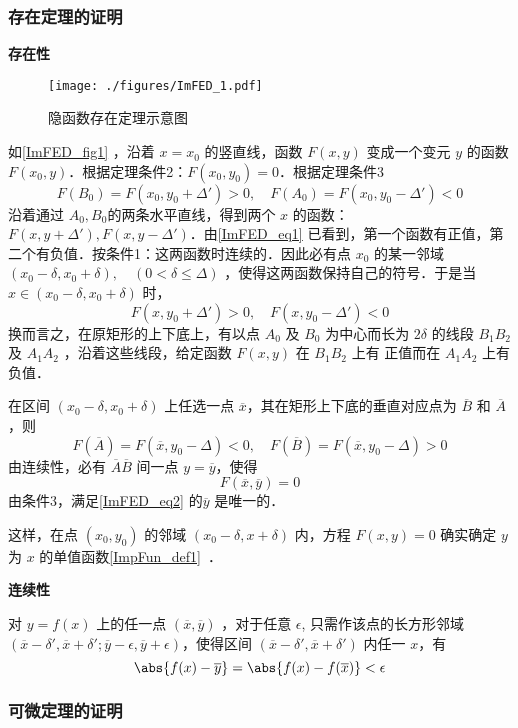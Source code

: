\subsubsection{存在定理的证明}
\textbf{存在性}
\begin{figure}[ht]
\centering
\texttt{[image: ./figures/ImFED\_1.pdf]}
\caption{隐函数存在定理示意图} \label{ImFED_fig1}
\end{figure}
如\autoref{ImFED_fig1} ，沿着 $x=x_0$ 的竖直线，函数 $F(x,y)$ 变成一个变元 $y$ 的函数 $F(x_0,y)$．根据定理条件2：$F(x_0,y_0)=0$．根据定理条件3
\begin{equation}\label{ImFED_eq1}
F(B_0)=F(x_0,y_0+\Delta')>0,\quad F(A_0)=F(x_0,y_0-\Delta')<0
\end{equation}
沿着通过 $A_0,B_0$的两条水平直线，得到两个 $x$ 的函数：$F(x,y+\Delta'),F(x,y-\Delta')$．由\autoref{ImFED_eq1} 已看到，第一个函数有正值，第二个有负值．按条件1：这两函数时连续的．因此必有点 $x_0$ 的某一邻域 $(x_0-\delta,x_0+\delta),\quad(0<\delta\leq\Delta)$ ，使得这两函数保持自己的符号．于是当 $x\in(x_0-\delta,x_0+\delta)$ 时，
\begin{equation}
F(x,y_0+\Delta')>0,\quad F(x,y_0-\Delta')<0
\end{equation}
换而言之，在原矩形的上下底上，有以点 $A_0$ 及 $B_0$ 为中心而长为 $2\delta$ 的线段  $B_1B_2$ 及 $A_1A_2$ ，沿着这些线段，给定函数 $F(x,y)$ 在 $B_1B_2$ 上有 正值而在 $A_1A_2$ 上有负值．

在区间 $(x_0-\delta,x_0+\delta)$ 上任选一点 $\overline{x}$，其在矩形上下底的垂直对应点为 $\overline{B}$ 和 $\overline{A}$，则
\begin{equation}
F(\overline{A})=F(\overline{x},y_0-\Delta)<0,\quad F(\overline{B})=F(\overline{x},y_0-\Delta)>0
\end{equation}
由连续性，必有 $\overline{A}\overline{B}$ 间一点 $y=\overline{y}$，使得
\begin{equation}\label{ImFED_eq2}
F(\overline{x},\overline{y})=0
\end{equation}
由条件3，满足\autoref{ImFED_eq2} 的$\overline{y}$ 是唯一的．

这样，在点 $(x_0,y_0)$ 的邻域 $(x_0-\delta,x+\delta)$ 内，方程 $F(x,y)=0$ 确实确定 $y$ 为 $x$ 的单值函数\autoref{ImpFun_def1}~．

\textbf{连续性}

对 $y=f(x)$ 上的任一点 $(\overline{x},\overline{y})$ ，对于任意 $\epsilon$, 只需作该点的长方形邻域 $(\overline{x}-\delta',\overline{x}+\delta';\overline{y}-\epsilon,\overline{y}+\epsilon)$，使得区间 $(\overline{x}-\delta',\overline{x}+\delta')$ 内任一 $x$，有
\begin{equation}
\abs{f(x)-\overline{y}}=\abs{f(x)-f(\overline{x})}<\epsilon
\end{equation}

\subsubsection{可微定理的证明}